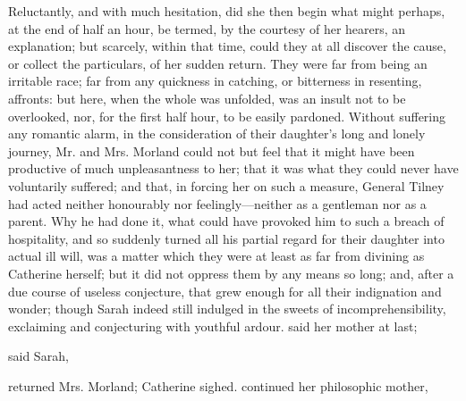 Reluctantly, and with much hesitation, did she then begin what might perhaps, at the end of half an hour, be termed, by the courtesy of her hearers, an explanation; but scarcely, within that time, could they at all discover the cause, or collect the particulars, of her sudden return. They were far from being an irritable race; far from any quickness in catching, or bitterness in resenting, affronts: but here, when the whole was unfolded, was an insult not to be overlooked, nor, for the first half hour, to be easily pardoned. Without suffering any romantic alarm, in the consideration of their daughter's long and lonely journey, Mr. and Mrs. Morland could not but feel that it might have been productive of much unpleasantness to her; that it was what they could never have voluntarily suffered; and that, in forcing her on such a measure, General Tilney had acted neither honourably nor feelingly---neither as a gentleman nor as a parent. Why he had done it, what could have provoked him to such a breach of hospitality, and so suddenly turned all his partial regard for their daughter into actual ill will, was a matter which they were at least as far from divining as Catherine herself; but it did not oppress them by any means so long; and, after a due course of useless conjecture, that  grew enough for all their indignation and wonder; though Sarah indeed still indulged in the sweets of incomprehensibility, exclaiming and conjecturing with youthful ardour.  said her mother at last; 

 said Sarah, 

 returned Mrs. Morland;  Catherine sighed.  continued her philosophic mother, 

